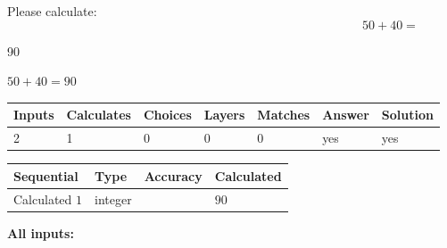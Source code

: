 \documentclass[12pt]{article}
\begin{document}
Please calculate:
\begin{equation}
50 +  %
40 = \nonumber
\end{equation}
 
 
 
\noindent{}
 
 

90
 
 
\noindent{}
 
 

 
 
 
\noindent{}
 
 

$ %
50 +  %
40=   %
90$
 
 
\noindent{}
 
 

 
   
   
   
   
\noindent\begin{tabular}{|l|l|l|l|l|l|l|}
 \hline
Inputs & Calculates & Choices & Layers & Matches & Answer & Solution \\ \hline
 2  & 
 1  & 
 0
  & 
 0  & 
 0  & 
  yes & 
  yes 
  \\ \hline
 \end{tabular}
   
   
   
   
\noindent{}
   
   
  
  
\noindent\begin{tabular}{|l|l|l|l|}
\hline
 Sequential & Type & Accuracy & Calculated \\ 
\hline
 
 
  Calculated $  1 $ & integer &  & 
  $ 90 $ 
 \\  \hline  
 \end{tabular}
   
   
   
   
\noindent\vspace{0.1in}\hspace{-0.08in} {\textbf{\Large{All inputs: }}}
   
   
  
\end{document}

